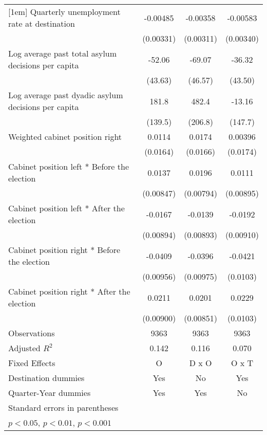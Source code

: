 \begin{table}[htbp]
\begin{tabular}{l*{3}{c}}
[1em]
Quarterly unemployment rate at destination&    -0.00485         &    -0.00358         &    -0.00583         \\
                    &   (0.00331)         &   (0.00311)         &   (0.00340)         \\
[1em]
Log average past total asylum decisions per capita&      -52.06         &      -69.07         &      -36.32         \\
                    &     (43.63)         &     (46.57)         &     (43.50)         \\
[1em]
Log average past dyadic asylum decisions per capita&       181.8         &       482.4\sym{*}  &      -13.16         \\
                    &     (139.5)         &     (206.8)         &     (147.7)         \\
[1em]
Weighted cabinet position right&      0.0114         &      0.0174         &     0.00396         \\
                    &    (0.0164)         &    (0.0166)         &    (0.0174)         \\
[1em]
Cabinet position left * Before the election&      0.0137         &      0.0196\sym{*}  &      0.0111         \\
                    &   (0.00847)         &   (0.00794)         &   (0.00895)         \\
[1em]
Cabinet position left * After the election&     -0.0167         &     -0.0139         &     -0.0192\sym{*}  \\
                    &   (0.00894)         &   (0.00893)         &   (0.00910)         \\
[1em]
Cabinet position right * Before the election&     -0.0409\sym{***}&     -0.0396\sym{***}&     -0.0421\sym{***}\\
                    &   (0.00956)         &   (0.00975)         &    (0.0103)         \\
[1em]
Cabinet position right * After the election&      0.0211\sym{*}  &      0.0201\sym{*}  &      0.0229\sym{*}  \\
                    &   (0.00900)         &   (0.00851)         &    (0.0103)         \\
\hline
Observations        &        9363         &        9363         &        9363         \\
Adjusted \(R^{2}\)  &       0.142         &       0.116         &       0.070         \\
Fixed Effects       &           O         &       D x O         &       O x T         \\
Destination dummies &         Yes         &          No         &         Yes         \\
Quarter-Year dummies&         Yes         &         Yes         &          No         \\
\hline\hline
\multicolumn{4}{l}{\footnotesize Standard errors in parentheses}\\
\multicolumn{4}{l}{\footnotesize \sym{*} \(p<0.05\), \sym{**} \(p<0.01\), \sym{***} \(p<0.001\)}\\
\end{tabular}
\end{table}
